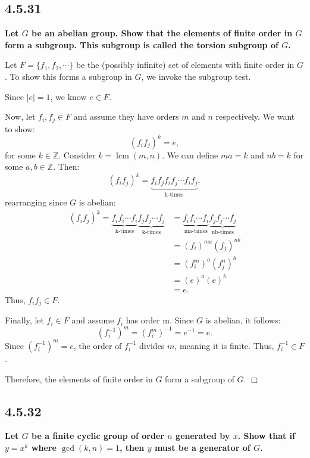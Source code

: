 \documentclass[11pt, a4paper]{article}
\DeclareMathOperator{\lcm}{lcm}
\begin{document}
\subsection{4.5.31}
\textbf{Let $G$ be an abelian group. Show that the elements of finite order in $G$ form a subgroup. This subgroup is called the torsion subgroup of $G$.}

Let $F = \{f_{1}, f_{2}, \cdots\}$ be the (possibly infinite) set of elements with finite order in $G$. To show this forms a subgroup in $G$, we invoke the subgroup test.

Since $|e| = 1$, we know $e \in F$.

Now, let $f_{i}, f_{j} \in F$ and assume they have orders $m$ and $n$ respectively. We want to show:
\[
  (f_{i} f_{j})^{k} = e,
\]
for some $k \in \mathbb{Z}$. Consider $k = \lcm(m, n)$. We can define $ma = k$ and $nb = k$ for some $a, b \in \mathbb{Z}$. Then:
\[
  (f_{i} f_{j})^k = \underbrace{f_{i} f_{j} f_{i} f_{j} \cdots f_{i} f_{j}}_{\text{k-times}},
\]
rearranging since $G$ is abelian:
\begin{align*}
  (f_{i} f_{j})^k = \underbrace{f_{i} f_{i} \cdots f_{i}}_{\text{k-times}} \underbrace{f_{j} f_{j} \cdots f_{j}}_{\text{k-times}} &= \underbrace{f_{i} f_{i} \cdots f_{i}}_{\text{ma-times}} \underbrace{f_{j} f_{j} \cdots f_{j}}_{\text{nb-times}} \\
                                        &= (f_{i})^{ma} (f_{j})^{nb} \\
                                        &= (f_{i}^m)^{a} (f_{j}^n)^{b} \\
                                        &= (e)^{a} (e)^{b} \\
                                        &= e.
\end{align*}
Thus, $f_{i} f_{j} \in F$.

\newpage

Finally, let $f_{i} \in F$ and assume $f_{i}$ has order m. Since $G$ is abelian, it follows:
\[
  (f_{i}^{-1})^m = (f_{i}^{m})^{-1} = e^{-1} = e.
\]
Since $(f_{i}^{-1})^m = e$, the order of $f_{i}^{-1}$ divides $m$, meaning it is finite. Thus, $f_{i}^{-1} \in F$.

Therefore, the elements of finite order in $G$ form a subgroup of $G$. $\Box$

\subsection{4.5.32}
\textbf{Let $G$ be a finite cyclic group of order $n$ generated by $x$. Show that if $y = x^k$ where $\gcd(k, n) = 1$, then $y$ must be a generator of $G$.}
\end{document}
